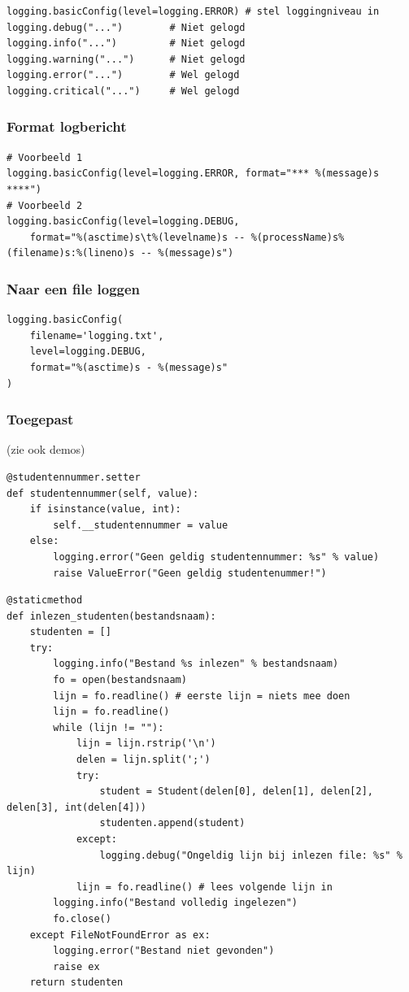\documentclass{article}
\begin{document}
\begin{verbatim}
logging.basicConfig(level=logging.ERROR) # stel loggingniveau in
logging.debug("...")        # Niet gelogd
logging.info("...")         # Niet gelogd
logging.warning("...")      # Niet gelogd
logging.error("...")        # Wel gelogd
logging.critical("...")     # Wel gelogd
\end{verbatim}

\subsubsection{Format logbericht}

\begin{verbatim}
# Voorbeeld 1
logging.basicConfig(level=logging.ERROR, format="*** %(message)s ****")
# Voorbeeld 2
logging.basicConfig(level=logging.DEBUG,
    format="%(asctime)s\t%(levelname)s -- %(processName)s%(filename)s:%(lineno)s -- %(message)s")
\end{verbatim}

\subsubsection{Naar een file loggen}

\begin{verbatim}
logging.basicConfig(
    filename='logging.txt',
    level=logging.DEBUG,
    format="%(asctime)s - %(message)s"
)
\end{verbatim}

\subsubsection{Toegepast}

(zie ook demos)

\begin{verbatim}
@studentennummer.setter
def studentennummer(self, value):
    if isinstance(value, int):
        self.__studentennummer = value
    else:
        logging.error("Geen geldig studentennummer: %s" % value)
        raise ValueError("Geen geldig studentenummer!")
\end{verbatim}

\begin{verbatim}
@staticmethod
def inlezen_studenten(bestandsnaam):
    studenten = []
    try:
        logging.info("Bestand %s inlezen" % bestandsnaam)
        fo = open(bestandsnaam)
        lijn = fo.readline() # eerste lijn = niets mee doen
        lijn = fo.readline()
        while (lijn != ""):
            lijn = lijn.rstrip('\n')
            delen = lijn.split(';')
            try:
                student = Student(delen[0], delen[1], delen[2], delen[3], int(delen[4]))
                studenten.append(student)
            except:
                logging.debug("Ongeldig lijn bij inlezen file: %s" % lijn)
            lijn = fo.readline() # lees volgende lijn in
        logging.info("Bestand volledig ingelezen")
        fo.close()
    except FileNotFoundError as ex:
        logging.error("Bestand niet gevonden")
        raise ex
    return studenten
\end{verbatim}
\end{document}
